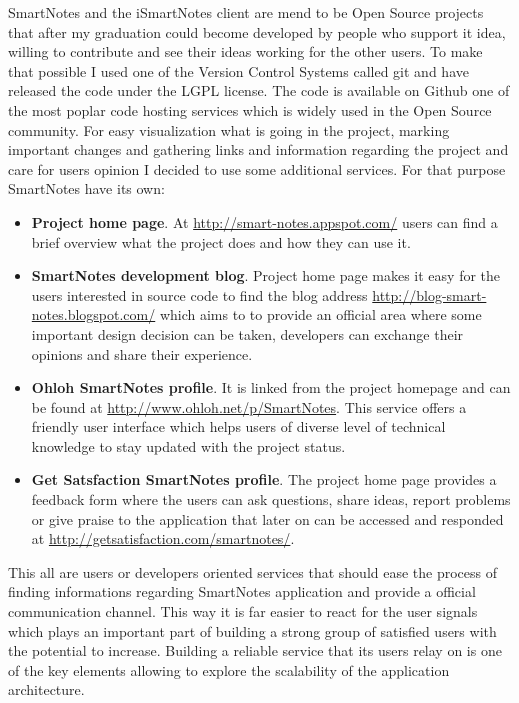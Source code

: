 SmartNotes and the iSmartNotes client are mend to be Open Source projects that after my graduation could become developed by people who support it idea, willing to contribute and see their ideas working for the other users. 
To make that possible I used one of the Version Control Systems called git and have released the code under the LGPL license. The code is available on Github one of the most poplar code hosting services which is widely used in the Open Source community. For easy visualization what is going in the project, marking important changes and gathering links and information regarding the project and care for users opinion I decided to use some additional services. For that purpose SmartNotes have its own:
\begin{itemize}
\item{\textbf{Project home page}. At \url{http://smart-notes.appspot.com/} users can find a brief overview what the project does and how they can use it.}
\item{\textbf{SmartNotes development blog}. Project home page makes it easy for the users interested in source code to find the blog address \url{http://blog-smart-notes.blogspot.com/} which aims to to provide an official area where some important design decision can be taken, developers can exchange their opinions and share their experience.}
\item{\textbf{Ohloh SmartNotes profile}. It is linked from the project homepage and can be found at \url{http://www.ohloh.net/p/SmartNotes}. This service offers a friendly user interface which helps users of  diverse level of technical knowledge to stay updated with the project status.}
\item{\textbf{Get Satsfaction SmartNotes profile}. The project home page provides a feedback form where the users can ask questions, share ideas, report problems or give praise to the application  that later on can be accessed and responded at \url{http://getsatisfaction.com/smartnotes/}.}
\end{itemize}
This all are users or developers oriented services that should ease the process of finding informations regarding SmartNotes application and provide a official communication channel. This way it is far easier to react for the user signals which plays an important part of building a strong group of satisfied users with the potential to increase. Building a reliable service that its users relay on is one of the key elements allowing to explore the scalability of the application architecture.
 
